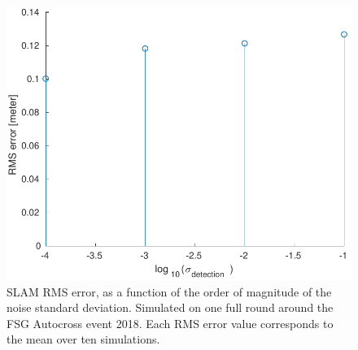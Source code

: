 \begin{figure}
    \centering
    \includegraphics[width=0.8\linewidth]{0_Images/6_Results/SLAMERMS.pdf}
    \caption[SLAM RMS error.]
    {SLAM RMS error, as a function of the order of magnitude of the noise standard deviation. Simulated on one full round around the FSG Autocross event 2018. Each RMS error value corresponds to the mean over ten simulations.}
    \label{Fig:SLAMERMS}
\end{figure}

\FloatBarrier